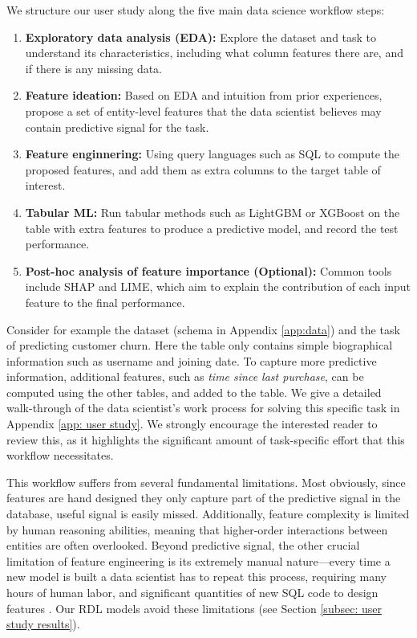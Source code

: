 We structure our user study along the five main data science workflow steps:
%
\begin{enumerate}[leftmargin=0.6cm,itemsep=3pt, parsep=0pt]
    \item \textbf{Exploratory data analysis (EDA):} Explore the dataset and task to understand its characteristics, including what column features there are, and if there is any missing data.
    \item \textbf{Feature ideation:} Based on EDA and intuition from prior experiences, propose a set of entity-level features that the data scientist believes may contain predictive signal for the task.
    \item \textbf{Feature enginnering:} Using query languages such as SQL to compute the proposed features, and add them as extra columns to the target table of interest. 
    \item \textbf{Tabular ML:} Run tabular methods such as LightGBM or XGBoost on the table with extra features to produce a predictive model, and record the test performance.
    \item \textbf{Post-hoc analysis of feature importance (Optional):} Common tools include SHAP and LIME, which aim to explain the contribution of each input feature to the final performance. %
\end{enumerate}

Consider for example the \handm dataset (schema in Appendix \ref{app:data}) and the task of predicting customer churn. Here the  table only contains simple biographical information such as username and joining date. To capture more predictive information, additional features, such as  \emph{time since last purchase}, can be computed using the other tables, and added to the  table. We give a detailed walk-through of the data scientist's work process for solving this specific task in Appendix \ref{app: user study}. We strongly encourage the interested reader to review this, as it highlights the significant amount of task-specific effort that this workflow necessitates.

 This workflow suffers from several fundamental limitations. Most obviously, since features are hand designed they only capture part of the predictive signal in the database, useful signal is easily missed. Additionally, feature complexity is limited by human reasoning abilities, meaning that higher-order interactions between entities are often overlooked. Beyond predictive signal, the other crucial limitation of feature engineering is its extremely manual nature---every time a new model is built a data scientist has to repeat this process, requiring many hours of human labor, and significant quantities of new SQL code to design features \citep{zheng2018feature}. Our RDL models avoid these limitations (see Section \ref{subsec: user study results}).


